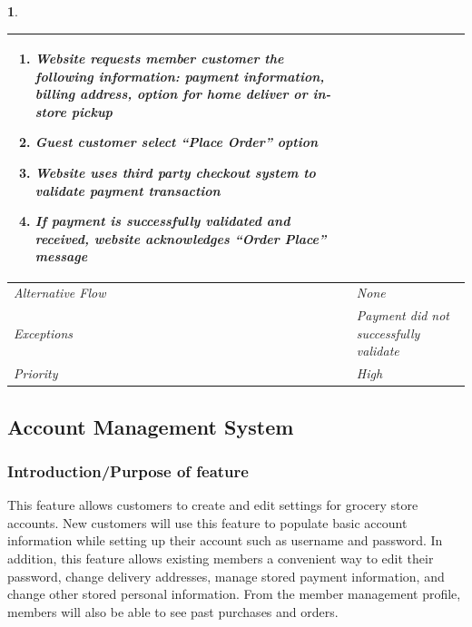 \documentclass{scrreprt}
\theoremstyle{funreq}
\newtheorem{funreq}{}
\begin{document}
\begin{funreq}
\begin{table}[H]
{\begin{tabularx}{\columnwidth}{|l|X|}
\begin{enumerate}
						\item Website requests member customer the following information: payment information, billing address, option for home deliver or in-store pickup %
					
						\item Guest customer select “Place Order” option
					
						\item Website uses third party checkout system to validate payment transaction
					
						\item If payment is successfully validated and received, website acknowledges “Order Place” message
					\end{enumerate}
					\\ \hline
					
					Alternative Flow & None                                       \\ \hline
					Exceptions       & Payment did not successfully validate \\ \hline
					Priority & High                                       \\ \hline
				\end{tabularx}%
			}
		\end{table}
	\end{funreq}

	\subsection{Account Management System}
\subsubsection{Introduction/Purpose of feature}
This feature allows customers to create and edit settings for grocery store accounts.  New customers will use this feature to populate basic account information while setting up their account such as username and password.  In addition, this feature allows existing members a convenient way to edit their password, change delivery addresses, manage stored payment information, and change other stored personal information.  From the member management profile, members will also be able to see past purchases and orders.
\end{document}
